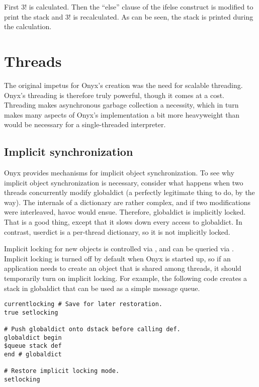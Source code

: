 First $3!$ is calculated.  Then the ``else'' clause of the ifelse construct is
modified to print the stack and $3!$ is recalculated.  As can be seen, the stack
is printed during the calculation.

\section{Threads}

The original impetus for Onyx's creation was the need for scalable threading.
Onyx's threading is therefore truly powerful, though it comes at a cost.
Threading makes asynchronous garbage collection a necessity, which in turn makes
many aspects of Onyx's implementation a bit more heavyweight than would be
necessary for a single-threaded interpreter.

\subsection{Implicit synchronization}

Onyx provides mechanisms for implicit object synchronization.  To see why
implicit object synchronization is necessary, consider what happens when two
threads concurrently modify globaldict (a perfectly legitimate thing to do, by
the way).  The internals of a dictionary are rather complex, and if two
modifications were interleaved, havoc would ensue.  Therefore, globaldict is
implicitly locked.  That is a good thing, except that it slows down every access
to globaldict.  In contrast, userdict is a per-thread dictionary, so it is not
implicitly locked.

Implicit locking for new objects is controlled via
, and can be queried via
.  Implicit
locking is turned off by default when Onyx is started up, so if an application
needs to create an object that is shared among threads, it should temporarily
turn on implicit locking.  For example, the following code creates a stack in
globaldict that can be used as a simple message queue.

\begin{verbatim}
currentlocking # Save for later restoration.
true setlocking

# Push globaldict onto dstack before calling def.
globaldict begin
$queue stack def
end # globaldict

# Restore implicit locking mode.
setlocking
\end{verbatim}

